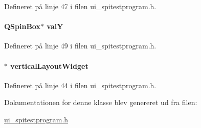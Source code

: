 Defineret på linje 47 i filen ui\+\_\+spitestprogram.\+h.

\paragraph[{\texorpdfstring{valY}{valY}}]{\setlength{\rightskip}{0pt plus 5cm}Q\+Spin\+Box$\ast$ valY}\hypertarget{class_ui___spi_test_program_a88a3fae2c7f772ec60bc66742e8c097e}{}\label{class_ui___spi_test_program_a88a3fae2c7f772ec60bc66742e8c097e}


Defineret på linje 49 i filen ui\+\_\+spitestprogram.\+h.

\paragraph[{\texorpdfstring{vertical\+Layout\+Widget}{verticalLayoutWidget}}]{$\ast$ vertical\+Layout\+Widget}\hypertarget{class_ui___spi_test_program_a4dab2ee47678bbea22fe10267a009293}{}\label{class_ui___spi_test_program_a4dab2ee47678bbea22fe10267a009293}


Defineret på linje 44 i filen ui\+\_\+spitestprogram.\+h.



Dokumentationen for denne klasse blev genereret ud fra filen\+:\begin{DoxyCompactItemize}
\item 
\hyperlink{ui__spitestprogram_8h}{ui\+\_\+spitestprogram.\+h}\end{DoxyCompactItemize}
